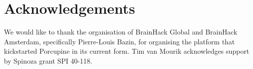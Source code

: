 \section{Acknowledgements}
We would like to  thank the organisation of BrainHack Global and BrainHack Amsterdam, specifically Pierre-Louis Bazin, for organising the platform that kickstarted Porcupine in its current form. Tim van Mourik acknowledges support by Spinoza grant SPI 40-118.